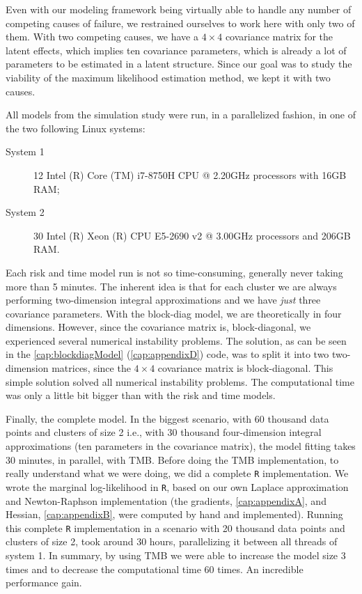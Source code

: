 Even with our modeling framework being virtually able to handle any
number of competing causes of failure, we restrained ourselves to work
here with only two of them. With two competing causes, we have
a \(4\times4\) covariance matrix for the latent effects, which implies
ten covariance parameters, which is already a lot of parameters to be
estimated in a latent structure. Since our goal was to study the
viability of the maximum likelihood estimation method, we kept it with
two causes.

All models from the simulation study were run, in a parallelized
fashion, in one of the two following Linux systems:
\begin{description}
 \item[System 1]
  12 Intel (R) Core (TM) i7-8750H CPU @ 2.20GHz processors
  with 16GB RAM;
 \item[System 2]
  30 Intel (R) Xeon (R) CPU E5-2690 v2 @ 3.00GHz processors
  and 206GB RAM.
\end{description}

Each risk and time model run is not so time-consuming, generally never
taking more than 5 minutes. The inherent idea is that for each cluster
we are always performing two-dimension integral approximations and we
have \textit{just} three covariance parameters. With the block-diag
model, we are theoretically in four dimensions. However, since the
covariance matrix is, block-diagonal, we experienced several numerical
instability problems. The solution, as can be seen in the
\autoref{cap:blockdiagModel} (\autoref{cap:appendixD}) code, was to
split it into two two-dimension matrices, since the \(4\times4\)
covariance matrix is block-diagonal.  This simple solution solved all
numerical instability problems. The computational time was only a little
bit bigger than with the risk and time models.

Finally, the complete model. In the biggest scenario, with 60 thousand
data points and clusters of size 2 i.e., with 30 thousand four-dimension
integral approximations (ten parameters in the covariance matrix), the
model fitting takes 30 minutes, in parallel, with TMB. Before doing the
TMB implementation, to really understand what we were doing, we did a
complete \texttt{R} implementation. We wrote the marginal log-likelihood
in \texttt{R}, based on our own Laplace approximation \cite{patrao} and
Newton-Raphson implementation (the gradients, \autoref{cap:appendixA},
and Hessian, \autoref{cap:appendixB}, were computed by hand and
implemented). Running this complete \texttt{R} implementation in a
scenario with 20 thousand data points and clusters of size 2, took
around 30 hours, parallelizing it between all threads of system 1. In
summary, by using TMB we were able to increase the model size 3 times
and to decrease the computational time 60 times. An incredible
performance gain.

